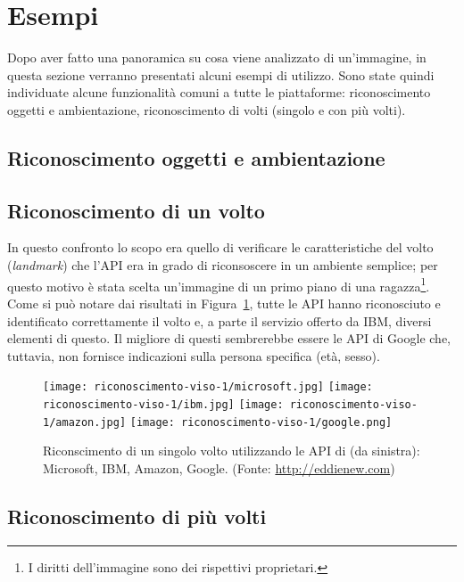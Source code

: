 
\section{Esempi}\label{sec:esempi}
Dopo aver fatto una panoramica su cosa viene analizzato di un'immagine, in questa sezione verranno presentati alcuni esempi di utilizzo.
Sono state quindi individuate alcune funzionalità comuni a tutte le piattaforme: riconoscimento oggetti e ambientazione, riconoscimento di volti (singolo e con più volti).
\subsection{Riconoscimento oggetti e ambientazione}\label{subsec:riconscimento-oggetti-ambientazione}
\subsection{Riconoscimento di un volto}\label{subsec:riconscimento-singolo-volto}
In questo confronto lo scopo era quello di verificare le caratteristiche del volto (\textit{landmark}) che l'API era in grado di riconsoscere in un ambiente semplice;
per questo motivo è stata scelta un'immagine di un primo piano di una ragazza\footnote{I diritti dell'immagine sono dei rispettivi proprietari.}.
Come si può notare dai risultati in Figura~\ref{fig:riconscimento-singolo-volto}, tutte le API hanno riconosciuto e identificato correttamente il volto e, a parte
il servizio offerto da IBM, diversi elementi di questo.
Il migliore di questi sembrerebbe essere le API di Google che, tuttavia, non fornisce indicazioni sulla persona specifica (età, sesso).
\begin{figure}[!h]
\begin{center}
	\texttt{[image: riconoscimento-viso-1/microsoft.jpg]}
	\texttt{[image: riconoscimento-viso-1/ibm.jpg]}
	\texttt{[image: riconoscimento-viso-1/amazon.jpg]}
	\texttt{[image: riconoscimento-viso-1/google.png]}
{\scriptsize \caption{Riconscimento di un singolo volto utilizzando le API di (da sinistra): Microsoft, IBM, Amazon, Google. (Fonte: \url{http://eddienew.com})}
\label{fig:riconscimento-singolo-volto}}
\end{center}
\end{figure}
%
\subsection{Riconoscimento di più volti}\label{subsec:riconscimento-piu-volti}
%
